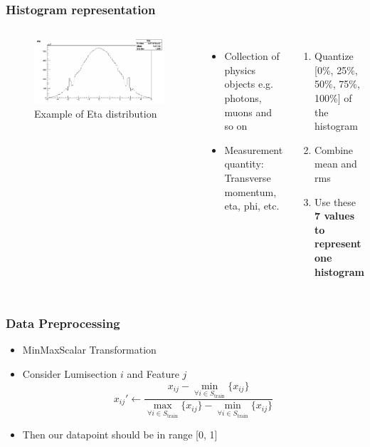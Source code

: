 \documentclass{beamer}
\begin{document}
\begin{frame}
\frametitle{Histogram representation}
\begin{columns}
    \begin{figure}
        \includegraphics[height=0.4\textheight, width=1.0\textwidth]{images/ex_eta_dist}
        \caption{Example of Eta distribution}
    \end{figure}
    \begin{itemize}
    \item Collection of physics objects e.g. photons, muons and so on
    \item Measurement quantity: Transverse momentum, eta, phi, etc.
    \end{itemize}
    \begin{enumerate}
        \item Quantize [0$\%$, 25$\%$, 50$\%$, 75$\%$, 100$\%$] of the histogram
        \item Combine mean and rms
        \item Use these \textbf{7 values to represent one histogram}
    \end{enumerate}
\end{columns}
\end{frame}
    
\begin{frame}
\frametitle{Data Preprocessing}
\begin{itemize}
    \item MinMaxScalar Transformation
    \item Consider Lumisection $i$ and Feature $j$
    \begin{equation}
        x_{ij}' \leftarrow \frac{x_{ij} - \min_{\forall i\in S_{\text{train}}}\{x_{ij}\}}{\max_{\forall i\in S_{\text{train}}}\{x_{ij}\} - \min_{\forall i\in S_{\text{train}}}\{x_{ij}\} }
    \end{equation}
    \item Then our datapoint should be in range [0, 1]
\end{itemize}
\end{frame}
\end{document}
